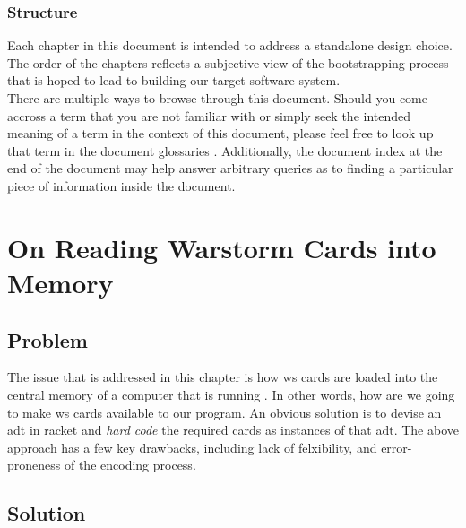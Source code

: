 \documentclass[10pt,oneside,a4paper]{skh-scrreprt}
\begin{document}
\subsection{Structure}


Each chapter in this document is intended to
address a standalone design choice.
The order of the chapters reflects a 
subjective view of the bootstrapping 
process that is hoped to lead to building 
our target software system.
\\

There are multiple ways to browse through this document.
Should you come accross a term that you are not familiar with or
simply seek the intended meaning of a term 
in the context of this document,
please feel free to look up that term in the document 
glossaries .
Additionally, the document index at the end of 
the document may help answer arbitrary queries
as to finding a particular piece of information
inside the document.

\chapter{On Reading Warstorm Cards into Memory}\label{chap:load-ws-cards}

\section{Problem}


The issue that 
is addressed 
in this chapter is 
how \gls{ws} cards
are loaded 
into the central memory 
of a computer 
that is running 
. 
In other words, 
how are we going 
to make \gls{ws} cards available 
to our program. 
An obvious solution is
to devise an \gls{adt} 
in \gls{racket} 
and \emph{hard code} 
the required cards 
as instances 
of that \gls{adt}. 
The above approach 
has a few key drawbacks, 
including lack of felxibility, 
and error-proneness 
of the encoding process.

\section{Solution}\label{sec:xml-cards-to-racket}

\end{document}
